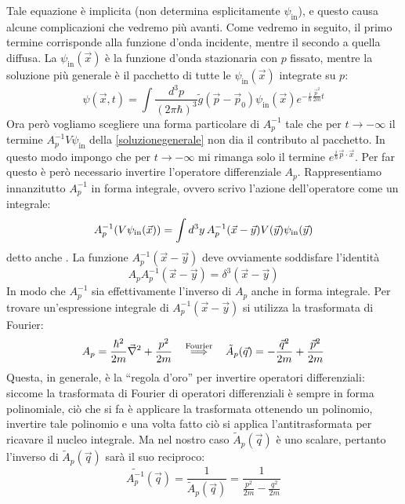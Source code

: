 \documentclass[../../FisicaTeorica.tex]{subfiles}
\begin{document}
Tale equazione {\`e} implicita (non determina esplicitamente
$\psi_{\text{in}}$), e questo causa alcune complicazioni che vedremo pi{\`u}
avanti. Come vedremo in seguito, il primo termine corrisponde alla funzione
d'onda incidente, mentre il secondo a quella diffusa. La $\psi_{\text{in}}
(\vec{x})$ {\`e} la funzione d'onda stazionaria con $p$ fissato, mentre la
soluzione pi{\`u} generale {\`e} il pacchetto di tutte le $\psi_{\text{in}}
(\vec{x})$ integrate su $p$:
\[ \psi (\vec{x}, t) = \int \frac{d^3 p}{(2 \pi \hbar)^3}  \tilde{g} (\vec{p}
   - \vec{p}_0) \psi_{\text{in}} (\vec{x}) e^{- \frac{i}{\hbar} 
   \frac{\vec{p}^2}{2 m} t} \]
Ora per{\`o} vogliamo scegliere una forma particolare di $A_p^{- 1}$ tale che
per $t \to - \infty$ il termine $A_p^{- 1} V \psi_{\text{in}}$ della \eqref{soluzionegenerale} non dia il
contributo al pacchetto. In questo modo impongo che per $t \to - \infty$ mi
rimanga solo il termine $e^{\frac{i}{\hbar}  \vec{p} \cdot \vec{x}}$. Per far
questo {\`e} per{\`o} necessario invertire l'operatore differenziale $A_p$.
Rappresentiamo innanzitutto $A_p^{- 1}$ in forma integrale, ovvero scrivo
l'azione dell'operatore come un integrale:
\begin{equation}
\label{kerintegrale}
A_p^{- 1} (V \psi_{\text{in}} (\vec{x})) = \int d^3 y \hspace{0.17em}
   A_p^{- 1} (\vec{x} - \vec{y}) V (\vec{y}) \psi_{\text{in}} (\vec{y})
\end{equation}
detto anche . La funzione $A_p^{- 1} (\vec{x} -
\vec{y})$ deve ovviamente soddisfare l'identit{\`a}
\[ A_p A_p^{- 1} (\vec{x} - \vec{y}) = \delta^3 (\vec{x} - \vec{y}) \]
In modo che $A_p^{- 1}$ sia effettivamente l'inverso di $A_p$ anche in forma
integrale. Per trovare un'espressione integrale di $A_p^{- 1} (\vec{x} -
\vec{y})$ si utilizza la trasformata di Fourier:
\[ A_p = \frac{\hbar^2}{2 m}  \vec{\nabla}^2 + \frac{p^2}{2 m} \quad
   \xRightarrow{\text{Fourier}} \quad \tilde{A}_p (\vec{q}) = -
   \frac{\vec{q}^2}{2 m} + \frac{\vec{p}^2}{2 m} \]
Questa, in generale, {\`e} la ``regola d'oro'' per invertire operatori
differenziali: siccome la trasformata di Fourier di operatori differenziali
{\`e} sempre in forma polinomiale, ci{\`o} che si fa {\`e} applicare la
trasformata ottenendo un polinomio, invertire tale polinomio e una volta fatto
ci{\`o} si applica l'antitrasformata per ricavare il nucleo integrale. Ma nel
nostro caso $\tilde{A}_p (\vec{q})$ {\`e} uno scalare, pertanto l'inverso di
$\tilde{A}_p (\vec{q})$ sar{\`a} il suo reciproco:
\[ \widetilde{A_p^{- 1}} (\vec{q}) = \frac{1}{\tilde{A}_p (\vec{q})} =
   \frac{1}{\frac{p^2}{2 m} - \frac{q^2}{2 m}} \]
\end{document}
